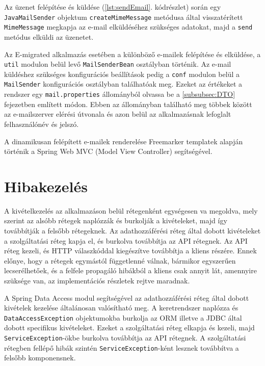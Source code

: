 Az üzenet felépítése és küldése (\ref{lst:sendEmail}. kódrészlet) során egy \texttt{JavaMailSender} objektum \texttt{createMimeMessage} metódusa által visszatérített \texttt{MimeMessage} megkapja az e-mail elküldéséhez szükséges adatokat, majd a \texttt{send} metódus elküldi az üzenetet. 

Az E-migrated alkalmazás esetében a különböző e-mailek felépítése és elküldése, a \texttt{util} modulon belül levő \texttt{MailSenderBean} osztályban történik. Az e-mail küldéshez szükséges konfigurációs beállítások pedig a \texttt{conf} modulon belül a \texttt{MailSender} konfigurációs osztályban találhatóak meg. Ezeket az értékeket a rendszer egy \texttt{mail.properties} állományból olvassa be a \ref{subsubsec:DTO} fejezetben említett módon. Ebben az állományban található meg többek között az e-mailszerver elérési útvonala és azon belül az alkalmazásnak lefoglalt felhasználónév és jelszó.

A dinamikusan felépített e-mailek renderelése Freemarker templatek alapján történik a Spring Web MVC (Model View Controller) segítségével.



\section{Hibakezelés}
\label{sec:hibakezeles}
A kivételkezelés az alkalmazáson belül rétegenként egységesen va megoldva, mely szerint az alsóbb rétegek naplózzák és burkolják a kivételeket, majd így továbbítják a felsőbb rétegeknek. Az adathozzáférési réteg által dobott kivételeket a szolgáltatási réteg kapja el, és burkolva továbbítja az API rétegnek. Az API réteg kezeli, és HTTP válaszkóddal kiegészítve továbbítja a kliens részére. Ennek előnye, hogy a rétegek egymástól függetlenné válnak, bármikor egyszerűen lecserélhetőek, és a felfele propagáló hibákból a kliens csak annyit lát, amennyire szüksége van, az implementációs részletek rejtve maradnak. 

A Spring Data Access modul segítségével az adathozzáférési réteg által dobott kivételek kezelése általánosan valósítható meg. A keretrendszer naplózza és \texttt{DataAccessException} objektumokba burkolja az ORM illetve a JDBC által dobott specifikus kivételeket. Ezeket  a szolgáltatási réteg elkapja és kezeli, majd \texttt{ServiceException}-ökbe burkolva továbbítja az API rétegnek. A szolgáltatási rétegben fellépő hibák szintén \texttt{ServiceException}-ként lesznek továbbítva a felsőbb komponensnek. 

